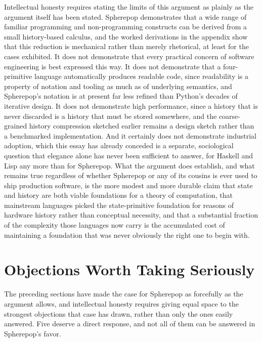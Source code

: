 \documentclass[11pt]{article}
\begin{document}
Intellectual honesty requires stating the limits of this argument as plainly as the argument itself has been stated. Spherepop demonstrates that a wide range of familiar programming and non-programming constructs can be derived from a small history-based calculus, and the worked derivations in the appendix show that this reduction is mechanical rather than merely rhetorical, at least for the cases exhibited. It does not demonstrate that every practical concern of software engineering is best expressed this way. It does not demonstrate that a four-primitive language automatically produces readable code, since readability is a property of notation and tooling as much as of underlying semantics, and Spherepop's notation is at present far less refined than Python's decades of iterative design. It does not demonstrate high performance, since a history that is never discarded is a history that must be stored somewhere, and the coarse-grained history compression sketched earlier remains a design sketch rather than a benchmarked implementation. And it certainly does not demonstrate industrial adoption, which this essay has already conceded is a separate, sociological question that elegance alone has never been sufficient to answer, for Haskell and Lisp any more than for Spherepop. What the argument does establish, and what remains true regardless of whether Spherepop or any of its cousins is ever used to ship production software, is the more modest and more durable claim that state and history are both viable foundations for a theory of computation, that mainstream languages picked the state-primitive foundation for reasons of hardware history rather than conceptual necessity, and that a substantial fraction of the complexity those languages now carry is the accumulated cost of maintaining a foundation that was never obviously the right one to begin with.

\section{Objections Worth Taking Seriously}

The preceding sections have made the case for Spherepop as forcefully as the argument allows, and intellectual honesty requires giving equal space to the strongest objections that case has drawn, rather than only the ones easily answered. Five deserve a direct response, and not all of them can be answered in Spherepop's favor.
\end{document}
